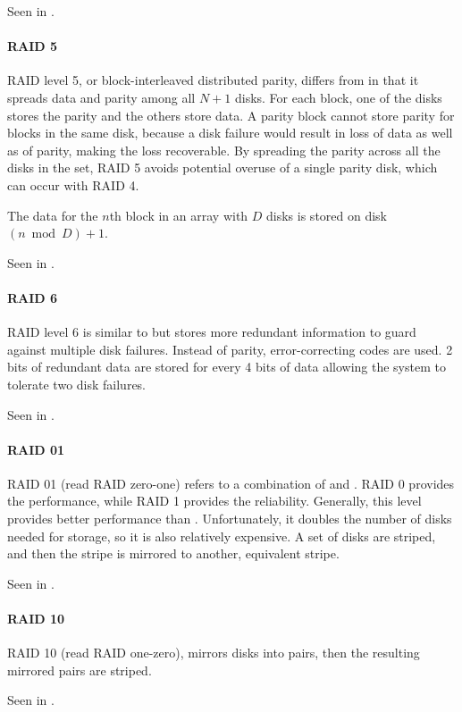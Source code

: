 Seen in .

\paragraph{RAID 5}\label{par:RAID_5}
RAID level 5, or block-interleaved distributed parity, differs from  in that it spreads data and parity among all $N + 1$ disks.
For each block, one of the disks stores the parity and the others store data.
A parity block cannot store parity for blocks in the same disk, because a disk failure would result in loss of data as well as of parity, making the loss recoverable.
By spreading the parity across all the disks in the set, RAID 5 avoids potential overuse of a single parity disk, which can occur with RAID 4.

The data for the $n$th block in an array with $D$ disks is stored on disk $(n \bmod D) + 1$.

Seen in .

\paragraph{RAID 6}\label{par:RAID_6}
RAID level 6 is similar to  but stores more redundant information to guard against multiple disk failures.
Instead of parity, error-correcting codes are used.
2 bits of redundant data are stored for every 4 bits of data allowing the system to tolerate two disk failures.

Seen in .

\paragraph{RAID 01}\label{par:RAID_01}
RAID 01 (read RAID zero-one) refers to a combination of  and .
RAID 0 provides the performance, while RAID 1 provides the reliability.
Generally, this level provides better performance than .
Unfortunately, it doubles the number of disks needed for storage, so it is also relatively expensive.
A set of disks are striped, and then the stripe is mirrored to another, equivalent stripe.

Seen in .

\paragraph{RAID 10}\label{par:RAID_10}
RAID 10 (read RAID one-zero), mirrors disks into pairs, then the resulting mirrored pairs are striped.

Seen in .


